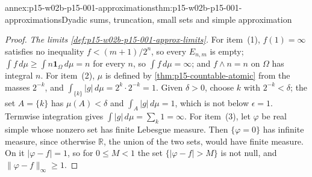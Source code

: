 \begin{annexitem}{annex:p15-w02b-p15-001-approximations}{thm:p15-w02b-p15-001-approximations}{Dyadic sums, truncation, small sets and simple approximation}
\begin{proof}
\emph{The limits \cref{def:p15-w02b-p15-001-approx-limits}.} For
item~(1), \(f(1)=\infty\) satisfies no inequality \(f<(m+1)/2^n\), so
every \(E_{n,m}\) is empty; \(\int f\,d\mu\geq\int n\mathbf1_\Omega\,d\mu=n\)
for every \(n\), so \(\int f\,d\mu=\infty\); and \(f\wedge n=n\) on
\(\Omega\) has integral \(n\). For item~(2), \(\mu\) is defined by
\cref{thm:p15-countable-atomic} from the masses \(2^{-k}\), and
\(\int_{\{k\}}|g|\,d\mu=2^k\cdot2^{-k}=1\). Given \(\delta>0\), choose
\(k\) with \(2^{-k}<\delta\); the set \(A=\{k\}\) has
\(\mu(A)<\delta\) and \(\int_A|g|\,d\mu=1\), which is not below
\(\epsilon=1\). Termwise integration gives
\(\int|g|\,d\mu=\sum_k1=\infty\). For item~(3), let \(\varphi\) be real
simple whose nonzero set has finite Lebesgue measure. Then
\(\{\varphi=0\}\) has infinite measure, since otherwise \(\mathbb R\),
the union of the two sets, would have finite measure. On it \(|\varphi-f|=1\), so
for \(0\leq M<1\) the set \(\{|\varphi-f|>M\}\) is not null, and
\(\|\varphi-f\|_\infty\geq1\).
\end{proof}
\end{annexitem}
